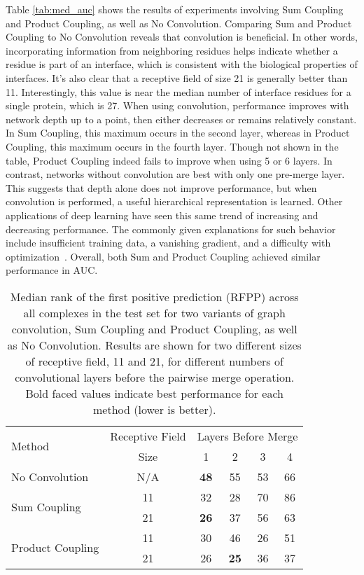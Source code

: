 Table \ref{tab:med_auc} shows the results of experiments involving Sum Coupling and Product Coupling, as well as No Convolution.
Comparing Sum and Product Coupling to No Convolution reveals that convolution is beneficial.
In other words, incorporating information from neighboring residues helps indicate whether a residue is part of an interface, which is consistent with the biological properties of interfaces.
It's also clear that a receptive field of size 21 is generally better than 11.
Interestingly, this value is near the median number of interface residues for a single protein, which is 27.
When using convolution, performance improves with network depth up to a point, then either decreases or remains relatively constant.
In Sum Coupling, this maximum occurs in the second layer, whereas in Product Coupling, this maximum occurs in the fourth layer.
Though not shown in the table, Product Coupling indeed fails to improve when using 5 or 6 layers.
In contrast, networks without convolution are best with only one pre-merge layer.
This suggests that depth alone does not improve performance, but when convolution is performed, a useful hierarchical representation is learned.
Other applications of deep learning have seen this same trend of increasing and decreasing performance.
The commonly given explanations for such behavior include insufficient training data, a vanishing gradient, and a difficulty with optimization~\cite{he2015}.
Overall, both Sum and Product Coupling achieved similar performance in AUC.

\begin{table}
	\begin{center}
		\begin{tabular}{lccccc}
			\toprule
			\multirow{2}{*}{Method} &
			Receptive Field & \multicolumn{4}{c}{Layers Before Merge} \\
			& Size & 1 & {2} & {3} & {4} \\
			\midrule
			No Convolution & N/A & \textbf{48} & 55 & 53 & 66 \\\cline{1-6}
			\multirow{2}{*}{Sum Coupling} & 11 & 32 & 28 & 70 & 86 \\
			& 21 & \textbf{26} & 37 & 56 & 63 \\\cline{1-6}
			\multirow{2}{*}{Product Coupling} & 11 & 30 & 46 & 26 & 51 \\
			& 21 & 26 & \textbf{25} & 36 & 37 \\
			\bottomrule
		\end{tabular}
		\caption{Median rank of the first positive prediction (RFPP) across all complexes in the test set for two variants of graph convolution, Sum Coupling and Product Coupling, as well as No Convolution. Results are shown for two different sizes of receptive field, 11 and 21, for different numbers of convolutional layers before the pairwise merge operation. Bold faced values indicate best performance for each method (lower is better).}
		\label{tab:med_rfpp}
	\end{center}
\end{table}

